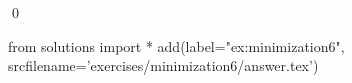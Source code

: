 
\begin{ex} 
  \label{ex:minimization6}
  
  \qed
\end{ex} 
\begin{python0}
from solutions import *
add(label="ex:minimization6",
    srcfilename='exercises/minimization6/answer.tex') 
\end{python0}

